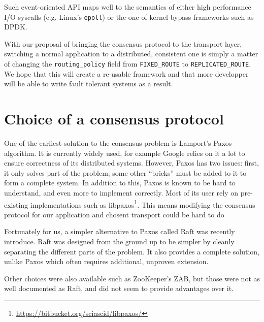 Such event-oriented API maps well to the semantics of either high performance I/O syscalls (e.g. Linux's \texttt{epoll}) or the one of kernel bypass frameworks such as DPDK.

\begin{lstfloat}

\end{lstfloat}

\begin{lstfloat}

\end{lstfloat}

With our proposal of bringing the consensus protocol to the transport layer, switching a normal application to a distributed, consistent one is simply a matter of changing the \texttt{routing\_policy} field from \texttt{FIXED\_ROUTE} to \texttt{REPLICATED\_ROUTE}.
We hope that this will create a re-usable framework and that more developper will be able to write fault tolerant systems as a result.

\section{Choice of a consensus protocol}

One of the earliest solution to the consensus problem is Lamport's Paxos algorithm\cite{paxos}.
It is currently widely used, for example Google relies on it a lot to ensure correctness of its distributed systems\cite{chubby, paxoslive}.
However, Paxos has two issues: first, it only solves part of the problem; some other ``bricks'' must be added to it to form a complete system.
In addition to this, Paxos is known to be hard to understand, and even more to implement correctly.
Most of its user rely on pre-existing implementations such as libpaxos\footnote{\url{https://bitbucket.org/sciascid/libpaxos/}}.
This means modifying the consensus protocol for our application and chosent transport could be hard to do

Fortunately for us, a simpler alternative to Paxos called Raft was recently introduce\cite{raft}.
Raft was designed from the ground up to be simpler by cleanly separating the different parts of the problem.
It also provides a complete solution, unlike Paxos which often requires additional, unproven extension\cite{paxoslive}.

Other choices were also available such as ZooKeeper's ZAB\cite{zookeeper}, but those were not as well documented as Raft, and did not seem to provide advantages over it.


